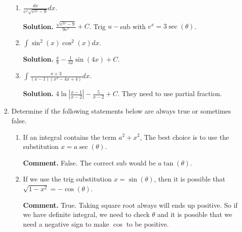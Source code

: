 \documentclass[12pt]{article}
\begin{document}
\begin{enumerate}
\begin{enumerate}
\item $\frac{dx}{e^x \sqrt{e^{2x}-9}}dx$.

\textbf{Solution. } $\frac{\sqrt{e^{2x}-9}}{9e^x}+C$. Trig $u-$sub with $e^x = 3\sec(\theta)$.

\item $\int \sin^2(x)\cos^2(x)dx$.

\textbf{Solution. } $\frac{x}{8}-\frac{1}{32}\sin(4x)+C$.

\item $\int \frac{x+3}{(x-1)(x^2-4x+4)}dx$.

\textbf{Solution. }$4\ln \left\vert\frac{x-1}{x-2}\right\vert -\frac{5}{x-2}+C$. They need to use partial fraction. 

\end{enumerate}


\item Determine if the following statements below are always true or sometimes false.

\begin{enumerate}
\item If an integral contains the term $a^2 + x^2$, The best choice is to use the substitution $x = a \sec(\theta)$. 

\textbf{Comment. } False. The correct sub would be $a\tan(\theta)$. 

\item If we use the trig substitution $x = \sin(\theta)$, then it is possible that $\sqrt{1-x^2}=-\cos(\theta)$.

\textbf{Comment. } True. Taking square root always will ends up positive. So if we have definite integral, we need to check $\theta$ and it is possible that we need a negative sign to make $\cos$ to be positive. 
\end{enumerate}

\end{enumerate}
\end{document}
